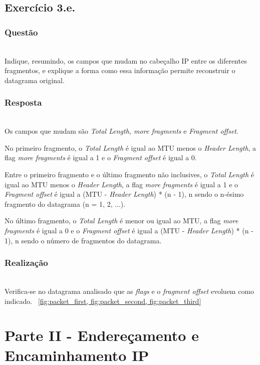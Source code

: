 \documentclass{llncs}
\begin{document}
\subsection{Exercício 3.e.}
\subsubsection{Questão}\rule[-10pt]{0pt}{10pt}\\

Indique, resumindo, os campos que mudam no cabeçalho IP entre os diferentes fragmentos, e explique a forma como essa informação permite reconstruir o datagrama original. 

\subsubsection{Resposta}\rule[-10pt]{0pt}{10pt}\\

Os campos que mudam são \textit{Total Length, more fragments} e \textit{Fragment offset}. 

No primeiro fragmento, o \textit{Total Length} é igual ao MTU menos o \textit{Header Length}, a flag \textit{more fragments} é igual a 1 e o \textit{Fragment offset} é igual a 0.

Entre o primeiro fragmento e o último fragmento não inclusives, o \textit{Total Length} é igual ao MTU menos o \textit{Header Length}, a flag \textit{more fragments} é igual a 1 e o \textit{Fragment offset} é igual a (MTU - \textit{Header Length}) * (n - 1), n sendo o n-ésimo fragmento do datagrama (n = 1, 2, ...).

No último fragmento, o \textit{Total Length} é menor ou igual ao MTU, a flag \textit{more fragments} é igual a 0 e o \textit{Fragment offset} é igual a (MTU - \textit{Header Length}) * (n - 1), n sendo o número de fragmentos do datagrama.

\subsubsection{Realização}\rule[-10pt]{0pt}{10pt}\\
Verifica-se no datagrama analisado que as \textit{flags} e o \textit{fragment offset} evoluem como indicado. ~\ref{fig:packet_first, fig:packet_second, fig:packet_third} 


\pagebreak
\section{Parte II - Endereçamento e Encaminhamento IP}
\end{document}
